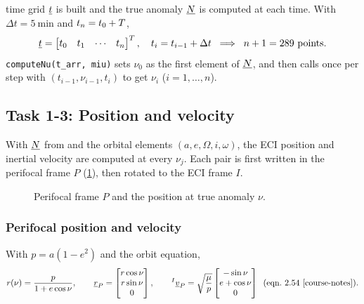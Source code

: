  time grid $\underline{t}$ is built and the true anomaly $\underline{N}$ is computed at each time. With $\Delta t = \SI{5}{\minute}$ and $t_n = t_0 + \newtxt{T}$,
\begin{equation}
\underline{t} = \begin{bmatrix} t_0 & t_1 & \cdots & t_n \end{bmatrix}^T,\quad t_i = t_{i-1} + \Delta t
\;\;\Longrightarrow\;\;
n + 1 = 289 \text{ points}.
\end{equation}
\texttt{computeNu(t\_arr,  miu)} sets $\nu_0$ as the first element of $\underline{N}$, and then calls \texttt{} once per step with $(t_{i-1},\nu_{i-1},t_i)$ to get $\nu_i$ ($i = 1,\dots,n$).

\subsection*{Task 1-3: Position and velocity}

With $\underline{N}$ from  and the orbital elements $(a,e,\Omega,i,\omega)$, the ECI position and inertial velocity are computed at every $\nu_j$. Each pair is first written in the perifocal frame $P$ (\cref{fig:t1-perifocal}), then rotated to the ECI frame $I$.

\begin{figure}[H]
\centering

\caption{Perifocal frame $P$ and the position at true anomaly $\nu$.}
\label{fig:t1-perifocal}
\end{figure}

\subsubsection*{Perifocal position and velocity}
With $p = a(1-e^2)$ and the orbit equation,
\begin{equation}
r(\nu) = \frac{p}{1+e\cos\nu},
\qquad
\underline{r}_P = \begin{bmatrix} r\cos\nu \\ r\sin\nu \\ 0 \end{bmatrix},
\qquad
{}^{I}\underline{v}_P = \sqrt{\frac{\mu}{p}}\begin{bmatrix} -\sin\nu \\ e + \cos\nu \\ 0 \end{bmatrix}
\;\;\text{(eqn.~2.54~\cite{course-notes})}.
\label{eq:t1-perifocal}
\end{equation}

